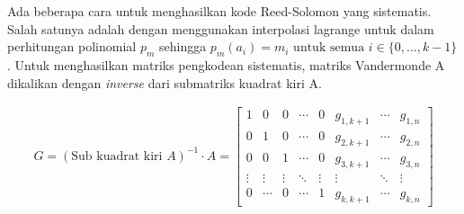 




Ada beberapa cara untuk menghasilkan kode Reed-Solomon yang sistematis. Salah satunya adalah dengan menggunakan interpolasi lagrange untuk dalam perhitungan polinomial $p_m$ sehingga $p_m(a_i) = m_i \text{ untuk semua } i \in \{0,\ldots,k-1\}$ \parencite{plank1996tutorial}. Untuk menghasilkan matriks pengkodean sistematis, matriks Vandermonde A dikalikan dengan \textit{inverse} dari submatriks kuadrat kiri A.

\begin{align}
	G = {(\text{Sub kuadrat kiri } A)}^{-1} \cdot A =
	\begin{bmatrix}
		1      & 0      & 0      & \cdots & 0      & g_{1,k+1} & \cdots & g_{1,n} \\
		0      & 1      & 0      & \cdots & 0      & g_{2,k+1} & \cdots & g_{2,n} \\
		0      & 0      & 1      & \cdots & 0      & g_{3,k+1} & \cdots & g_{3,n} \\
		\vdots & \vdots & \vdots & \ddots & \vdots & \vdots    & \ddots & \vdots  \\
		0      & \cdots & 0      & \cdots & 1      & g_{k,k+1} & \cdots & g_{k,n}
	\end{bmatrix}
	\label{eq:encoding_matrix}
\end{align}

